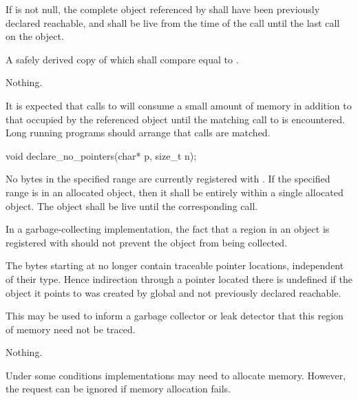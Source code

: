 \begin{itemdescr}
\pnum
\requires If  is not null, the complete object referenced by 
shall have been previously declared reachable, and shall be
live from the time of the call until the last
 call on the object.

\pnum
\returns A safely derived copy of  which shall compare equal to .

\pnum
\throws Nothing.

\pnum \begin{note} It is expected that calls to  will consume
a small amount of memory in addition to that occupied by the referenced object until the
matching call to  is encountered. Long running programs
should arrange that calls are matched. \end{note} \end{itemdescr}

%
\begin{itemdecl}
void declare_no_pointers(char* p, size_t n);
\end{itemdecl}

\begin{itemdescr}
\pnum
\requires No bytes in the specified range
are currently registered with
. If the specified range is in an allocated object,
then it shall be entirely within a single allocated object. The object shall be
live until the corresponding  call. \begin{note} In
a garbage-collecting implementation, the fact that a region in an object is
registered with  should not prevent the object from
being collected. \end{note}

\pnum
\effects The  bytes starting at  no longer contain
traceable pointer locations, independent of their type. Hence
indirection through a pointer located there is undefined if the object
it points to was created by global  and not
previously declared reachable. \begin{note} This may be used to inform a
garbage collector or leak detector that this region of memory need not
be traced. \end{note}

\pnum
\throws Nothing.

\pnum
\begin{note} Under some conditions implementations may need to allocate memory.
However, the request can be ignored if memory allocation fails. \end{note}
\end{itemdescr}


